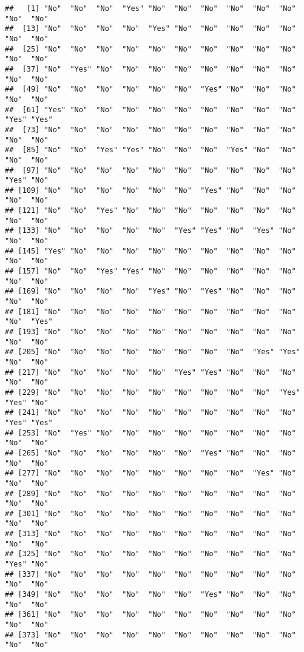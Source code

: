 \documentclass[
]{article}
\begin{document}
\begin{verbatim}
##   [1] "No"  "No"  "No"  "Yes" "No"  "No"  "No"  "No"  "No"  "No"  "No"  "No" 
##  [13] "No"  "No"  "No"  "No"  "Yes" "No"  "No"  "No"  "No"  "No"  "No"  "No" 
##  [25] "No"  "No"  "No"  "No"  "No"  "No"  "No"  "No"  "No"  "No"  "No"  "No" 
##  [37] "No"  "Yes" "No"  "No"  "No"  "No"  "No"  "No"  "No"  "No"  "No"  "No" 
##  [49] "No"  "No"  "No"  "No"  "No"  "No"  "Yes" "No"  "No"  "No"  "No"  "No" 
##  [61] "Yes" "No"  "No"  "No"  "No"  "No"  "No"  "No"  "No"  "No"  "Yes" "Yes"
##  [73] "No"  "No"  "No"  "No"  "No"  "No"  "No"  "No"  "No"  "No"  "No"  "No" 
##  [85] "No"  "No"  "Yes" "Yes" "No"  "No"  "No"  "Yes" "No"  "No"  "No"  "No" 
##  [97] "No"  "No"  "No"  "No"  "No"  "No"  "No"  "No"  "No"  "No"  "Yes" "No" 
## [109] "No"  "No"  "No"  "No"  "No"  "No"  "Yes" "No"  "No"  "No"  "No"  "No" 
## [121] "No"  "No"  "Yes" "No"  "No"  "No"  "No"  "No"  "No"  "No"  "No"  "No" 
## [133] "No"  "No"  "No"  "No"  "No"  "Yes" "Yes" "No"  "Yes" "No"  "No"  "No" 
## [145] "Yes" "No"  "No"  "No"  "No"  "No"  "No"  "No"  "No"  "No"  "No"  "No" 
## [157] "No"  "No"  "Yes" "Yes" "No"  "No"  "No"  "No"  "No"  "No"  "No"  "No" 
## [169] "No"  "No"  "No"  "No"  "Yes" "No"  "Yes" "No"  "No"  "No"  "No"  "No" 
## [181] "No"  "No"  "No"  "No"  "No"  "No"  "No"  "No"  "No"  "No"  "No"  "Yes"
## [193] "No"  "No"  "No"  "No"  "No"  "No"  "No"  "No"  "No"  "No"  "No"  "No" 
## [205] "No"  "No"  "No"  "No"  "No"  "No"  "No"  "No"  "Yes" "Yes" "No"  "No" 
## [217] "No"  "No"  "No"  "No"  "No"  "Yes" "Yes" "No"  "No"  "No"  "No"  "No" 
## [229] "No"  "No"  "No"  "No"  "No"  "No"  "No"  "No"  "No"  "Yes" "Yes" "No" 
## [241] "No"  "No"  "No"  "No"  "No"  "No"  "No"  "No"  "No"  "No"  "Yes" "Yes"
## [253] "No"  "Yes" "No"  "No"  "No"  "No"  "No"  "No"  "No"  "No"  "No"  "No" 
## [265] "No"  "No"  "No"  "No"  "No"  "No"  "Yes" "No"  "No"  "No"  "No"  "No" 
## [277] "No"  "No"  "No"  "No"  "No"  "No"  "No"  "No"  "Yes" "No"  "No"  "No" 
## [289] "No"  "No"  "No"  "No"  "No"  "No"  "No"  "No"  "No"  "No"  "No"  "No" 
## [301] "No"  "No"  "No"  "No"  "No"  "No"  "No"  "No"  "No"  "No"  "No"  "No" 
## [313] "No"  "No"  "No"  "No"  "No"  "No"  "No"  "No"  "No"  "No"  "No"  "No" 
## [325] "No"  "No"  "No"  "No"  "No"  "No"  "No"  "No"  "No"  "No"  "Yes" "No" 
## [337] "No"  "No"  "No"  "No"  "No"  "No"  "No"  "No"  "No"  "No"  "No"  "No" 
## [349] "No"  "No"  "No"  "No"  "No"  "No"  "Yes" "No"  "No"  "No"  "No"  "No" 
## [361] "No"  "No"  "No"  "No"  "No"  "No"  "No"  "No"  "No"  "No"  "No"  "No" 
## [373] "No"  "No"  "No"  "No"  "No"  "No"  "No"  "No"  "No"  "No"  "No"  "No" 

\end{verbatim}
\end{document}
